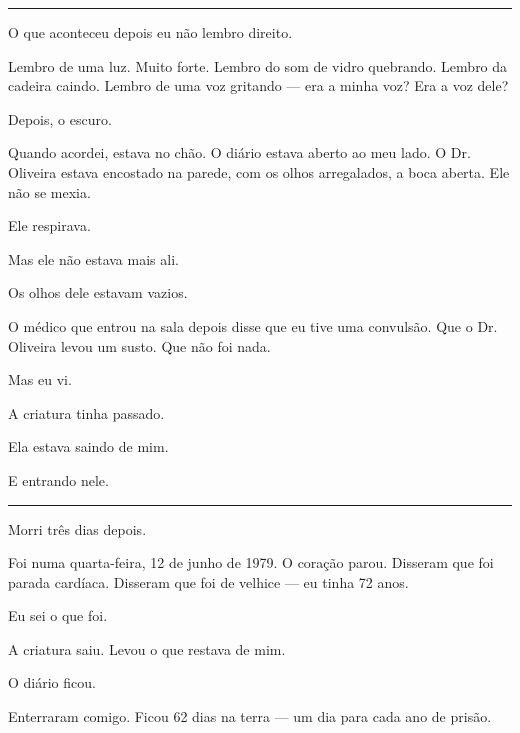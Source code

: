 \vspace{0.5em}\noindent\rule{\textwidth}{0.5pt}\vspace{0.5em}

\noindent O que aconteceu depois eu não lembro direito.

\noindent Lembro de uma luz. Muito forte. Lembro do som de vidro quebrando. Lembro da cadeira caindo. Lembro de uma voz gritando --- era a minha voz? Era a voz dele?

\noindent Depois, o escuro.

\noindent Quando acordei, estava no chão. O diário estava aberto ao meu lado. O Dr. Oliveira estava encostado na parede, com os olhos arregalados, a boca aberta. Ele não se mexia.

\noindent Ele respirava.

\noindent Mas ele não estava mais ali.

\noindent Os olhos dele estavam vazios.

\noindent O médico que entrou na sala depois disse que eu tive uma convulsão. Que o Dr. Oliveira levou um susto. Que não foi nada.

\noindent Mas eu vi.

\noindent A criatura tinha passado.

\noindent Ela estava saindo de mim.

\noindent E entrando nele.

\vspace{0.5em}\noindent\rule{\textwidth}{0.5pt}\vspace{0.5em}

\noindent Morri três dias depois.

\noindent Foi numa quarta-feira, 12 de junho de 1979. O coração parou. Disseram que foi parada cardíaca. Disseram que foi de velhice --- eu tinha 72 anos.

\noindent Eu sei o que foi.

\noindent A criatura saiu. Levou o que restava de mim.

\noindent O diário ficou.

\noindent Enterraram comigo. Ficou 62 dias na terra --- um dia para cada ano de prisão.

